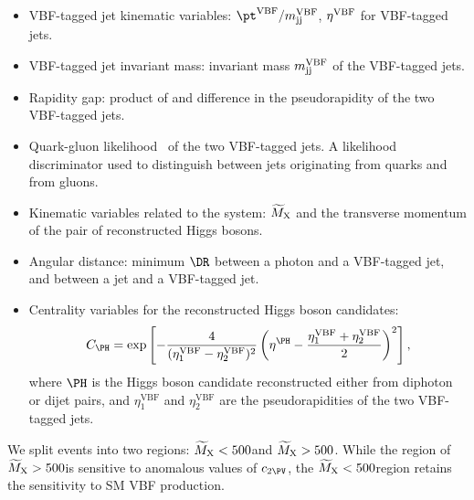 \documentclass[11pt,twoside,a4paper,cmspaper,final,collab]{cms-tdr}
\begin{document}
\begin{itemize}
\item VBF-tagged jet kinematic variables: $\ptvbf/\Mjjvbf$, $\eta^{\mathrm{VBF}}$ for VBF-tagged jets.
\item VBF-tagged jet invariant mass: invariant mass $m^{\mathrm{VBF}}_\text{jj}$ of the VBF-tagged jets.
\item Rapidity gap: product of and difference in the pseudorapidity of the two VBF-tagged jets.
\item Quark-gluon likelihood~\cite{CMS:2013kfa,JetsInRun2} of the two VBF-tagged jets. A likelihood discriminator used to distinguish between jets originating from quarks and from gluons.
\item Kinematic variables related to the \HH system: $\widetilde{M}_{\mathrm{X}}$ and the transverse momentum of the pair of reconstructed Higgs bosons. 
\item Angular distance: minimum $\DR$ between a photon and a VBF-tagged jet, and between a {\cPqb} jet and a VBF-tagged jet.
\item Centrality variables for the reconstructed Higgs boson candidates: 
\begin{equation}
C_{\PH} = \exp\left[-\frac{4}{(\eta^{\mathrm{VBF}}_1-\eta^{\mathrm{VBF}}_2)^2}\left(\eta^{\PH}-\frac{\eta^{\mathrm{VBF}}_{1}+\eta^{\mathrm{VBF}}_{2}}{2} \right)^2  \right],
\end{equation}
where $\PH$ is the Higgs boson candidate reconstructed either from diphoton or dijet pairs, and $\eta^{\mathrm{VBF}}_{1}$ and $\eta^{\mathrm{VBF}}_{2}$ are the pseudorapidities of the two VBF-tagged jets.

\end{itemize}

We split events into two regions: $\widetilde{M}_{\mathrm{X}}<500$\GeV and $\widetilde{M}_{\mathrm{X}}>500$\GeV. While the region of $\widetilde{M}_{\mathrm{X}}>500$\GeV is sensitive to anomalous values of $\ctwov$, the $\widetilde{M}_{\mathrm{X}}<500$\GeV region retains the sensitivity to SM VBF \HH production.
\end{document}

